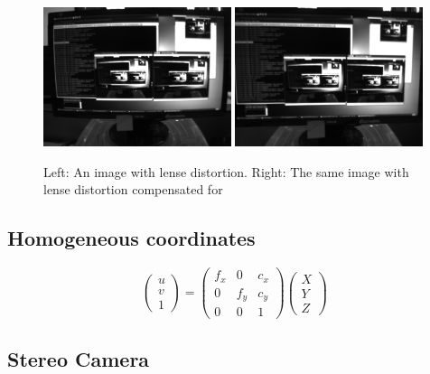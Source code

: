 \begin{figure}[h!]
  \centering
    \includegraphics[width=0.49\textwidth]{chapters/images/distorted}
    \includegraphics[width=0.49\textwidth]{chapters/images/undistorted}
  \caption{Left: An image with lense distortion.  Right: The same image with lense distortion
compensated for}
\end{figure}

\subsection{Homogeneous coordinates}


\begin{equation}
 \begin{pmatrix}
  u \\
  v \\
  1 
 \end{pmatrix} =
 \begin{pmatrix}
  f_x & 0 & c_x \\
  0 & f_y & c_y \\
  0 & 0   & 1 
 \end{pmatrix}
 \begin{pmatrix}
  X \\ Y \\ Z
 \end{pmatrix}
\end{equation}


\subsection{Stereo Camera}

